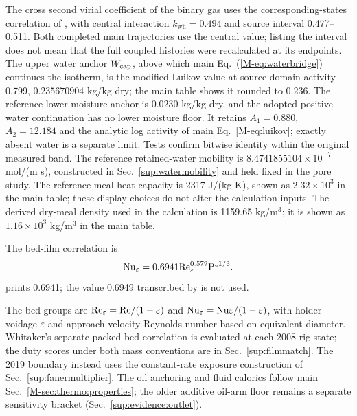 \documentclass[11pt]{article}
\begin{document}
The cross second virial coefficient of the binary gas uses the
corresponding-states correlation of \citet{plyasunov2003crossvirial}, with
central interaction $k_{\mathrm{wh}}=0.494$ and source interval
0.477--0.511. Both completed main trajectories use the central value;
listing the interval does not mean that the full coupled histories were
recalculated at its endpoints. The upper water anchor $W_{\mathrm{cap}}$, above which
main Eq.~(\ref*{M-eq:waterbridge}) continues the isotherm, is the modified
Luikov value at source-domain activity 0.799, $0.235670904$ kg/kg dry; the
main table shows it rounded to 0.236. The reference lower moisture anchor is
0.0230 kg/kg dry, and the adopted positive-water continuation has no lower
moisture floor. It retains $A_1=0.880$, $A_2=12.184$ and the analytic log
activity of main Eq.~\ref*{M-eq:luikov}; exactly absent water is a separate
limit. Tests confirm bitwise identity within the original measured band.
The reference retained-water mobility is
$8.4741855104\times10^{-7}$ mol/(m s), constructed in
Sec.~\ref{sup:watermobility} and held fixed in the pore study.
The reference meal heat capacity is 2317 J/(kg K), shown as
$2.32\times10^3$ in the main table; these display choices do not alter
the calculation inputs.
The derived dry-meal density used in the calculation is 1159.65 kg/m$^3$;
it is shown as $1.16\times10^3$ kg/m$^3$ in the main table.

The bed-film correlation is
\[
\mathrm{Nu}_\varepsilon=0.6941\mathrm{Re}_\varepsilon^{0.579}\mathrm{Pr}^{1/3}.
\]
\citet{faner2008desolventizado} prints 0.6941; the value 0.6949 transcribed by
\citet{coletto2022modeling} is not used.

The bed groups are $\mathrm{Re}_\varepsilon=\mathrm{Re}/(1-\varepsilon)$ and
$\mathrm{Nu}_\varepsilon=\mathrm{Nu}\varepsilon/(1-\varepsilon)$, with holder voidage
$\varepsilon$ and approach-velocity Reynolds number based on equivalent
diameter. Whitaker's separate packed-bed correlation \citep{whitaker1972forced}
is evaluated at each 2008 rig state; the duty scores under both mass
conventions are in Sec.~\ref{sup:filmmatch}. The 2019 boundary instead
uses the constant-rate exposure construction of Sec.~\ref{sup:fanermultiplier}.
The oil anchoring and fluid calorics follow main
Sec.~\ref*{M-sec:thermo:properties}; the older additive oil-arm floor
remains a separate sensitivity bracket (Sec.~\ref{sup:evidence:outlet}).
\end{document}
